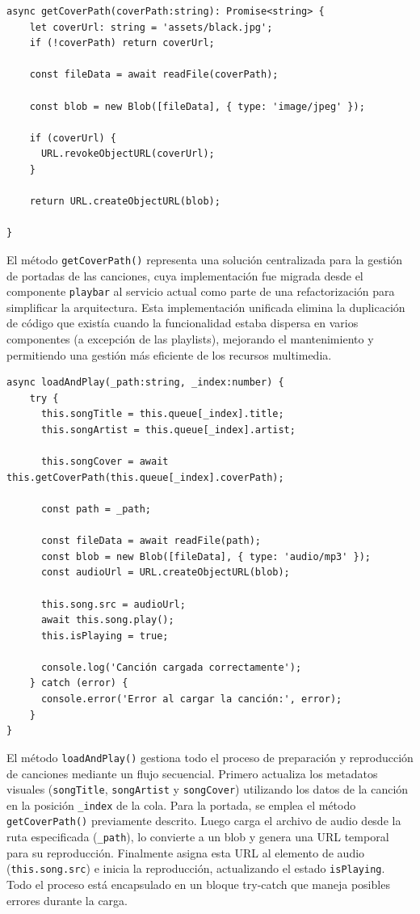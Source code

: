 \documentclass[11pt, a4paper]{article}
\begin{document}
                \begin{lstlisting}[caption={getCoverPath()}]
async getCoverPath(coverPath:string): Promise<string> {
    let coverUrl: string = 'assets/black.jpg';
    if (!coverPath) return coverUrl;

    const fileData = await readFile(coverPath);
    
    const blob = new Blob([fileData], { type: 'image/jpeg' });

    if (coverUrl) {
      URL.revokeObjectURL(coverUrl);
    }

    return URL.createObjectURL(blob);

}
                \end{lstlisting}

                El método \verb|getCoverPath()| representa una solución centralizada para la gestión de portadas de las canciones, cuya implementación fue migrada desde el componente \verb|playbar| al servicio actual como parte de una refactorización para simplificar la arquitectura. Esta implementación unificada elimina la duplicación de código que existía cuando la funcionalidad estaba dispersa en varios componentes (a excepción de las playlists), mejorando el mantenimiento y permitiendo una gestión más eficiente de los recursos multimedia.

                \begin{lstlisting}[caption={loadAndPlay()}]
async loadAndPlay(_path:string, _index:number) {
    try {
      this.songTitle = this.queue[_index].title;
      this.songArtist = this.queue[_index].artist;
      
      this.songCover = await this.getCoverPath(this.queue[_index].coverPath);

      const path = _path;
      
      const fileData = await readFile(path);
      const blob = new Blob([fileData], { type: 'audio/mp3' });
      const audioUrl = URL.createObjectURL(blob);
      
      this.song.src = audioUrl;
      await this.song.play();
      this.isPlaying = true;
      
      console.log('Canción cargada correctamente');
    } catch (error) {
      console.error('Error al cargar la canción:', error);
    }
}
                \end{lstlisting}

                El método \verb|loadAndPlay()| gestiona todo el proceso de preparación y reproducción de canciones mediante un flujo secuencial. Primero actualiza los metadatos visuales (\verb|songTitle|, \verb|songArtist| y \verb|songCover|) utilizando los datos de la canción en la posición \verb|_index| de la cola. Para la portada, se emplea el método \verb|getCoverPath()| previamente descrito. Luego carga el archivo de audio desde la ruta especificada (\verb|_path|), lo convierte a un blob y genera una URL temporal para su reproducción. Finalmente asigna esta URL al elemento de audio (\verb|this.song.src|) e inicia la reproducción, actualizando el estado \verb|isPlaying|. Todo el proceso está encapsulado en un bloque try-catch que maneja posibles errores durante la carga.
\end{document}
